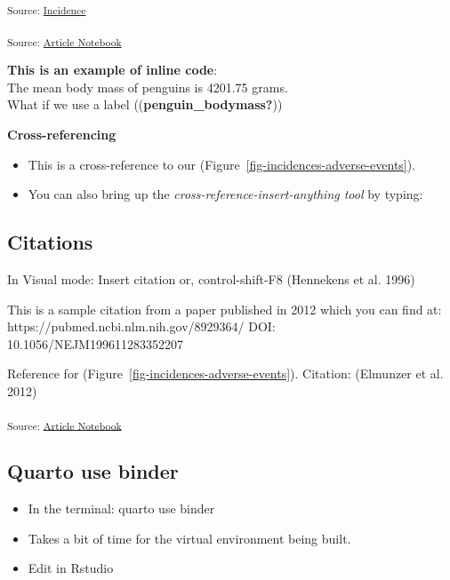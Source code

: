 \documentclass[
  letterpaper,
  DIV=11,
  numbers=noendperiod]{scrartcl}
\providecommand{\tightlist}{%
  \setlength{\itemsep}{0pt}\setlength{\parskip}{0pt}}\usepackage{longtable,booktabs,array}
\begin{document}
\textsubscript{Source:
\href{https://rccline.github.io/quarto-manuscript01/notebooks/incidences-preview.html\#cell-fig-incidences-adverse-events}{Incidence}}

\textsubscript{Source:
\href{https://rccline.github.io/quarto-manuscript01/index.qmd.html}{Article
Notebook}}

\textbf{This is an example of inline code}:\\
The mean body mass of penguins is 4201.75 grams.\\
What if we use a label ((\textbf{penguin\_bodymass?}))

\textbf{Cross-referencing}

\begin{itemize}
\tightlist
\item
  This is a cross-reference to our
  (Figure~\ref{fig-incidences-adverse-events}).\\
\item
  You can also bring up the \emph{cross-reference-insert-anything tool}
  by typing:
\end{itemize}

\subsection{Citations}\label{citations}

In Visual mode: Insert citation or, control-shift-F8 (Hennekens et al.
1996)

This is a sample citation from a paper published in 2012 which you can
find at: https://pubmed.ncbi.nlm.nih.gov/8929364/ DOI:
10.1056/NEJM199611283352207

Reference for (Figure~\ref{fig-incidences-adverse-events}). Citation:
(Elmunzer et al. 2012)

\textsubscript{Source:
\href{https://rccline.github.io/quarto-manuscript01/index.qmd.html}{Article
Notebook}}

\subsection{Quarto use binder}\label{quarto-use-binder}

\begin{itemize}
\tightlist
\item
  In the terminal: quarto use binder\\
\item
  Takes a bit of time for the virtual environment being built.
\item
  Edit in Rstudio
\end{itemize}
\end{document}
